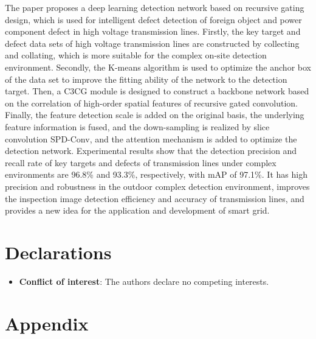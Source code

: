 \documentclass[sn-mathphys,Numbered]{sn-jnl}%
\theoremstyle{thmstyleone}%
\theoremstyle{thmstyletwo}%
\theoremstyle{thmstylethree}%
\begin{document}
The paper proposes a deep learning detection network based on recursive gating design, which is used for intelligent defect detection of foreign object and power component defect in high voltage transmission lines. Firstly, the key target and defect data sets of high voltage transmission lines are constructed by collecting and collating, which is more suitable for the complex on-site detection environment. Secondly, the K-means algorithm is used to optimize the anchor box of the data set to improve the fitting ability of the network to the detection target. Then, a C3CG module is designed to construct a backbone network based on the correlation of high-order spatial features of recursive gated convolution. Finally, the feature detection scale is added on the original basis, the underlying feature information is fused, and the down-sampling is realized by slice convolution SPD-Conv, and the attention mechanism is added to optimize the detection network. Experimental results show that the detection precision and recall rate of key targets and defects of transmission lines under complex environments are 96.8\% and 93.3\%, respectively, with mAP of 97.1\%. It has high precision and robustness in the outdoor complex detection environment, improves the inspection image detection efficiency and accuracy of transmission lines, and provides a new idea for the application and development of smart grid.

\section*{Declarations}

\begin{itemize}
\item \textbf{Conflict of interest}: The authors declare no competing interests.
\end{itemize}


\section*{Appendix}\label{Appendix}
\end{document}
